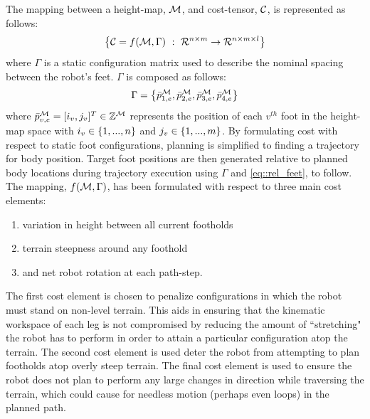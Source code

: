 			The mapping between a height-map,  ${\cal M}$, and cost-tensor, ${\cal C}$, is represented as follows:
				\begin{equation}
					\left\{ {\cal C} = f({\cal M},\Gamma)\text{ }:\text{ }{\cal R}^{n\times m} \rightarrow {\cal R}^{n\times m \times l} \right\}
					\label{eq::cost_mapping}
				\end{equation}
			where $\Gamma$ is a static configuration matrix used to describe the nominal spacing between the robot's feet. $\Gamma$ is composed as follows:
				\begin{equation*}
					\Gamma = \left\{\bar{p}_{1,e}^{{\cal M}},\bar{p}_{2,e}^{{\cal M}},\bar{p}_{3,e}^{{\cal M}},\bar{p}_{4,e}^{{\cal M}}\right\}
					\label{eq::cost_gamma}
				\end{equation*}
			where $\bar{p}_{v,e}^{{\cal M}}=[i_{v},j_{v}]^{T}\in{\Bbb Z}^{{\cal M}}$ represents the position of each $v^{th}$ foot in the height-map space with $i_{v}\in \left\{1,...,n\right\}$ and $j_{v}\in\left\{1,...,m\right\}$. By formulating cost with respect to static foot configurations, planning is simplified to finding a trajectory for body position. Target foot positions are then generated relative to planned body locations during trajectory execution using $\Gamma$ and \ref{eq::rel_feet}, to follow. The mapping, $f({\cal M},\Gamma)$, has been formulated with respect to three main cost elements:
				\begin{enumerate}
					\item variation in height between all current footholds
					\item terrain steepness around any foothold
					\item and net robot rotation at each path-step.
				\end{enumerate}
			The first cost element is chosen to penalize configurations in which the robot must stand on non-level terrain. This aids in ensuring that the kinematic workspace of each leg is not compromised by reducing the amount of ``stretching" the robot has to perform in order to attain a particular configuration atop the terrain. The second cost element is used deter the robot from attempting to plan footholds atop overly steep terrain. The final cost element is used to ensure the robot does not plan to perform any large changes in direction while traversing the terrain, which could cause for needless motion (perhaps even loops) in the planned path. 

